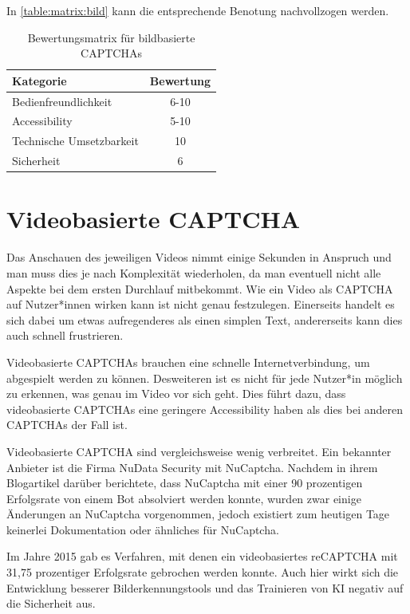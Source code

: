 In \autoref{table:matrix:bild} kann die entsprechende Benotung nachvollzogen werden.

\begin{table}[h!]
    \caption{Bewertungsmatrix für bildbasierte CAPTCHAs}
    \begin{center}
        \begin{tabular}{l|c}
            Kategorie                       & Bewertung \\\hline
            Bedienfreundlichkeit            & 6-10         \\
            Accessibility                   & 5-10        \\
            Technische Umsetzbarkeit        & 10         \\
            Sicherheit                      & 6         
        \end{tabular}
    \end{center}
    \label{table:matrix:bild}
\end{table}

\section{Videobasierte CAPTCHA}
Das Anschauen des jeweiligen Videos nimmt einige Sekunden in Anspruch und man muss dies je nach Komplexität wiederholen, 
da man eventuell nicht alle Aspekte bei dem ersten Durchlauf mitbekommt.
Wie ein Video als CAPTCHA auf Nutzer*innen wirken kann ist nicht genau festzulegen.
Einerseits handelt es sich dabei um etwas aufregenderes als einen simplen Text, andererseits kann dies auch schnell frustrieren.

Videobasierte CAPTCHAs brauchen eine schnelle Internetverbindung, um abgespielt werden zu können. 
Desweiteren ist es nicht für jede Nutzer*in möglich zu erkennen, was genau im Video vor sich geht.
Dies führt dazu, dass videobasierte CAPTCHAs eine geringere Accessibility haben als dies bei anderen CAPTCHAs der Fall ist. 

Videobasierte CAPTCHA sind vergleichsweise wenig verbreitet. 
Ein bekannter Anbieter ist die Firma NuData Security mit NuCaptcha.
Nachdem \citeauthor{elie} in ihrem Blogartikel  darüber berichtete, 
dass NuCaptcha mit einer 90 prozentigen Erfolgsrate von einem Bot absolviert werden konnte,
wurden zwar einige Änderungen an NuCaptcha vorgenommen, jedoch existiert zum heutigen Tage keinerlei Dokumentation oder ähnliches für NuCaptcha.

Im Jahre 2015 gab es Verfahren, mit denen ein videobasiertes reCAPTCHA mit 31,75 prozentiger Erfolgsrate gebrochen werden konnte. 
Auch hier wirkt sich die Entwicklung besserer Bilderkennungstools und das Trainieren von KI negativ auf die Sicherheit aus.\cite[p.xx]{surveyofresearch}

